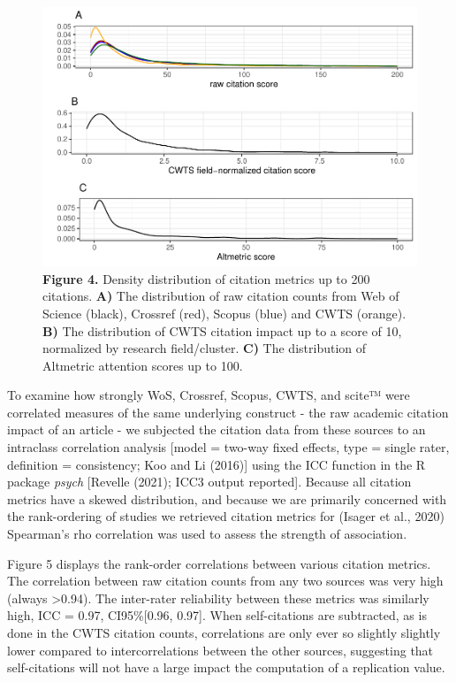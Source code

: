 \documentclass[
  man,floatsintext]{apa6}
\begin{document}
~

\begin{figure}
\centering
\includegraphics{RVcn_feasibility_in_social_neuroscience_cortex_files/figure-latex/fig4-1.pdf}
\caption{\label{fig:fig4}\textbf{Figure 4.} Density distribution of citation metrics up to 200 citations. \textbf{A)} The distribution of raw citation counts from Web of Science (black), Crossref (red), Scopus (blue) and CWTS (orange). \textbf{B)} The distribution of CWTS citation impact up to a score of 10, normalized by research field/cluster. \textbf{C)} The distribution of Altmetric attention scores up to 100.}
\end{figure}

To examine how strongly WoS, Crossref, Scopus, CWTS, and scite™ were correlated measures of the same underlying construct - the raw academic citation impact of an article - we subjected the citation data from these sources to an intraclass correlation analysis {[}model = two-way fixed effects, type = single rater, definition = consistency; Koo and Li (2016){]} using the ICC function in the R package \emph{psych} {[}Revelle (2021); ICC3 output reported{]}. Because all citation metrics have a skewed distribution, and because we are primarily concerned with the rank-ordering of studies we retrieved citation metrics for (Isager et al., 2020) Spearman's rho correlation was used to assess the strength of association.

Figure 5 displays the rank-order correlations between various citation metrics. The correlation between raw citation counts from any two sources was very high (always \textgreater0.94). The inter-rater reliability between these metrics was similarly high, ICC = 0.97, CI95\%{[}0.96, 0.97{]}. When self-citations are subtracted, as is done in the CWTS citation counts, correlations are only ever so slightly slightly lower compared to intercorrelations between the other sources, suggesting that self-citations will not have a large impact the computation of a replication value.
\end{document}
